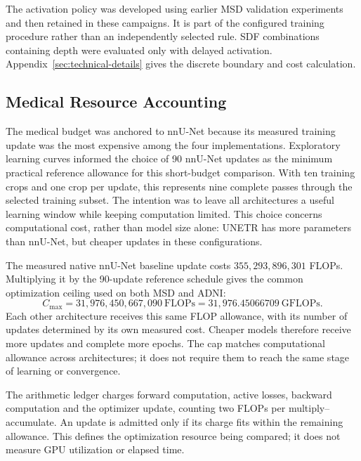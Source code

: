 \documentclass[12pt,a4paper]{article}
\begin{document}
The activation policy was developed using earlier MSD validation
experiments and then retained in these campaigns. It is part of the
configured training procedure rather than an independently selected rule. SDF
combinations containing depth were evaluated only with delayed activation.
Appendix~\ref{sec:technical-details} gives the discrete boundary and
cost calculation.

\subsection{Medical Resource Accounting}\label{sec:detailed-resource-accounting}

The medical budget was anchored to nnU-Net because its measured training
update was the most expensive among the four implementations. Exploratory
learning curves informed the choice of 90 nnU-Net updates as the minimum
practical reference allowance for this short-budget comparison. With ten
training crops and one crop per update, this represents nine complete
passes through the selected training subset. The intention was to leave
all architectures a useful learning window while keeping computation
limited. This choice concerns computational cost, rather than model size
alone: UNETR has more parameters than nnU-Net, but cheaper updates in
these configurations.

The measured native nnU-Net baseline update costs
$355{,}293{,}896{,}301$ FLOPs. Multiplying it by the 90-update reference
schedule gives the common optimization ceiling used on both MSD and ADNI:
\begin{equation}
 C_{\max}=31{,}976{,}450{,}667{,}090\ \mathrm{FLOPs}
          =31{,}976.45066709\ \mathrm{GFLOPs}.
\label{eq:main-numerical-cap}
\end{equation}
Each other architecture receives this same FLOP allowance, with its
number of updates determined by its own measured cost. Cheaper models
therefore receive more updates and complete more epochs. The cap matches
computational allowance across architectures; it does not require them
to reach the same stage of learning or convergence.

The arithmetic ledger charges forward computation, active losses,
backward computation and the optimizer update, counting two FLOPs per
multiply--accumulate. An update is admitted only if its charge fits
within the remaining allowance. This defines the optimization resource
being compared; it does not measure GPU utilization or elapsed time.
\end{document}
